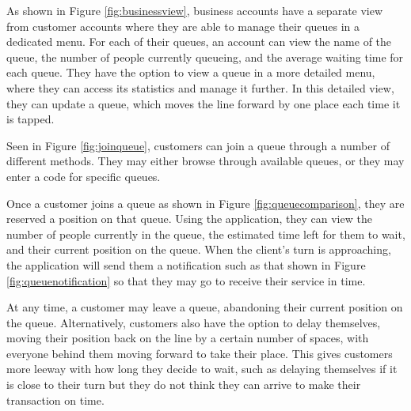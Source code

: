 As shown in Figure \ref{fig:businessview}, business accounts have a separate view from customer accounts where they are able to manage their queues in a dedicated menu. For each of their queues, an account can view the name of the queue, the number of people currently queueing, and the average waiting time for each queue. They have the option to view a queue in a more detailed menu, where they can access its statistics and manage it further. In this detailed view, they can update a queue, which moves the line forward by one place each time it is tapped.

Seen in Figure \ref{fig:joinqueue}, customers can join a queue through a number of different methods. They may either browse through available queues, or they may enter a code for specific queues. 

Once a customer joins a queue as shown in Figure \ref{fig:queuecomparison}, they are reserved a position on that queue. Using the application, they can view the number of people currently in the queue, the estimated time left for them to wait, and their current position on the queue. When the client’s turn is approaching, the application will send them a notification such as that shown in Figure \ref{fig:queuenotification} so that they may go to receive their service in time. 

At any time, a customer may leave a queue, abandoning their current position on the queue. Alternatively, customers also have the option to delay themselves, moving their position back on the line by a certain number of spaces, with everyone behind them moving forward to take their place. This gives customers more leeway with how long they decide to wait, such as delaying themselves if it is close to their turn but they do not think they can arrive to make their transaction on time.